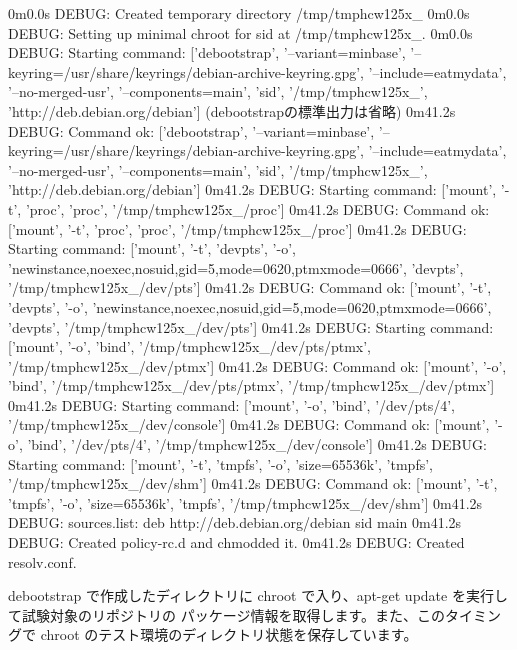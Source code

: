 \documentclass[mingoth,a4paper]{jsarticle}
\begin{document}
\begin{commandline}
0m0.0s DEBUG: Created temporary directory /tmp/tmphcw125x_
0m0.0s DEBUG: Setting up minimal chroot for sid at /tmp/tmphcw125x_.
0m0.0s DEBUG: Starting command: ['debootstrap', '--variant=minbase',
'--keyring=/usr/share/keyrings/debian-archive-keyring.gpg', '--include=eatmydata',
'--no-merged-usr', '--components=main', 'sid', '/tmp/tmphcw125x_', 'http://deb.debian.org/debian']
  (debootstrapの標準出力は省略)
0m41.2s DEBUG: Command ok: ['debootstrap', '--variant=minbase',
'--keyring=/usr/share/keyrings/debian-archive-keyring.gpg', '--include=eatmydata', '--no-merged-usr',
'--components=main', 'sid', '/tmp/tmphcw125x_', 'http://deb.debian.org/debian']
0m41.2s DEBUG: Starting command: ['mount', '-t', 'proc', 'proc', '/tmp/tmphcw125x_/proc']
0m41.2s DEBUG: Command ok: ['mount', '-t', 'proc', 'proc', '/tmp/tmphcw125x_/proc']
0m41.2s DEBUG: Starting command: ['mount', '-t', 'devpts',
'-o', 'newinstance,noexec,nosuid,gid=5,mode=0620,ptmxmode=0666', 'devpts', '/tmp/tmphcw125x_/dev/pts']
0m41.2s DEBUG: Command ok: ['mount', '-t', 'devpts',
'-o', 'newinstance,noexec,nosuid,gid=5,mode=0620,ptmxmode=0666', 'devpts', '/tmp/tmphcw125x_/dev/pts']
0m41.2s DEBUG: Starting command: ['mount', '-o', 'bind', '/tmp/tmphcw125x_/dev/pts/ptmx',
'/tmp/tmphcw125x_/dev/ptmx']
0m41.2s DEBUG: Command ok: ['mount', '-o', 'bind', '/tmp/tmphcw125x_/dev/pts/ptmx', '/tmp/tmphcw125x_/dev/ptmx']
0m41.2s DEBUG: Starting command: ['mount', '-o', 'bind', '/dev/pts/4', '/tmp/tmphcw125x_/dev/console']
0m41.2s DEBUG: Command ok: ['mount', '-o', 'bind', '/dev/pts/4', '/tmp/tmphcw125x_/dev/console']
0m41.2s DEBUG: Starting command: ['mount', '-t', 'tmpfs', '-o', 'size=65536k', 'tmpfs', '/tmp/tmphcw125x_/dev/shm']
0m41.2s DEBUG: Command ok: ['mount', '-t', 'tmpfs', '-o', 'size=65536k', 'tmpfs', '/tmp/tmphcw125x_/dev/shm']
0m41.2s DEBUG: sources.list:
  deb http://deb.debian.org/debian sid main
0m41.2s DEBUG: Created policy-rc.d and chmodded it.
0m41.2s DEBUG: Created resolv.conf.
\end{commandline}

debootstrap で作成したディレクトリに chroot で入り、apt-get update を実行して試験対象のリポジトリの
パッケージ情報を取得します。また、このタイミングで chroot のテスト環境のディレクトリ状態を保存しています。
\end{document}
